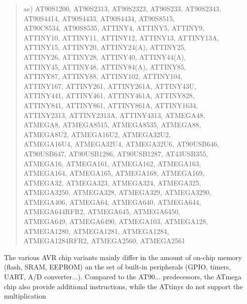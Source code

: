 \documentclass[12pt,twoside]{report}
\begin{document}
\begin{quote}
ae) AT90S1200, AT90S2313, AT90S2323, AT90S233, AT90S2343,\\
    AT90S4414, AT90S4433, AT90S4434, AT90S8515,\\
    AT90C8534, AT90S8535, ATTINY4, ATTINY5, ATTINY9,\\
    ATTINY10, ATTINY11, ATTINY12, ATTINY13, ATTINY13A,\\
    ATTINY15, ATTINY20, ATTINY24(A), ATTINY25,\\
    ATTINY26, ATTINY28, ATTINY40, ATTINY44(A),\\
    ATTINY45, ATTINY48, ATTINY84(A), ATTINY85,\\
    ATTINY87, ATTINY88, ATTINY102, ATTINY104,\\
    ATTINY167, ATTINY261, ATTINY261A, ATTINY43U,\\
    ATTINY441, ATTINY461, ATTINY461A, ATTINY828,\\
    ATTINY841, ATTINY861, ATTINY861A, ATTINY1634,\\
    ATTINY2313, ATTINY2313A, ATTINY4313, ATMEGA48,\\
    ATMEGA8, ATMEGA8515, ATMEGA8535, ATMEGA88,\\
    ATMEGA8U2, ATMEGA16U2, ATMEGA32U2,\\
    ATMEGA16U4, ATMEGA32U4, ATMEGA32U6, AT90USB646,\\
    AT90USB647, AT90USB1286, AT90USB1287, AT43USB355,\\
    ATMEGA16, ATMEGA161, ATMEGA162, ATMEGA163,\\
    ATMEGA164, ATMEGA165, ATMEGA168, ATMEGA169,\\
    ATMEGA32, ATMEGA323, ATMEGA324, ATMEGA325,\\
    ATMEGA3250, ATMEGA328, ATMEGA329, ATMEGA3290,\\
    ATMEGA406, ATMEGA64, ATMEGA640, ATMEGA644,\\
    ATMEGA644RFR2, ATMEGA645, ATMEGA6450,\\
    ATMEGA649, ATMEGA6490, ATMEGA103, ATMEGA128,\\
    ATMEGA1280, ATMEGA1281, ATMEGA1284,\\
    ATMEGA1284RFR2, ATMEGA2560, ATMEGA2561
\end{quote}
The various AVR chip variants mainly differ in the amount of
on-chip memory (flash, SRAM, EEPROM) an the set of built-in
peripherals (GPIO, timers, UART, A/D converter...).  Compared to
the AT90... predecessors, the ATmega chip also provide additional
instructions, while the ATtinys do not support the multiplication
\end{document}
